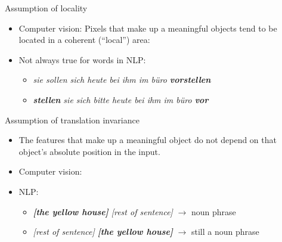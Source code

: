 
\begin{vbframe}{Assumption of locality}

\vfill

\begin{itemize}
	\item Computer vision: Pixels that make up a meaningful objects tend to be located in a coherent (``local'') area:
\end{itemize}
\begin{itemize}
	\item Not always true for words in NLP:
	\begin{itemize}
		\item \textit{sie sollen sich heute bei ihm im büro \textbf{vorstellen}}
		\item \textit{\textbf{stellen} sie sich bitte heute bei ihm im büro \textbf{vor}}
	\end{itemize}
\end{itemize}

\vfill

\end{vbframe}


\begin{vbframe}{Assumption of translation invariance}

\vfill

\begin{itemize}
	\item The features that make up a meaningful object do not depend on that object's absolute position in the input.
	\item Computer vision: 
\end{itemize}
\begin{itemize}
	\item NLP:
		\begin{itemize}
			\item \textit{\textbf{[the yellow house]} [rest of sentence]} $\rightarrow$ noun phrase
			\item \textit{[rest of sentence] \textbf{[the yellow house]}} $\rightarrow$ still a noun phrase
		\end{itemize}
\end{itemize}

\vfill

\end{vbframe}

